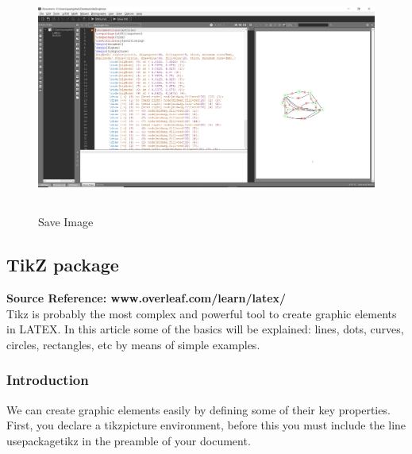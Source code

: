\documentclass[a4paper,10pt]{article}
\begin{document}
\paragraph{}
\begin{figure}[H]
		\centering
		\includegraphics[height = 3in]{tikzFunc2.png}
		\caption[Optional caption]{Save Image}
		\label{fig:Repository}
	\end{figure}
\paragraph{}
\subsection{TikZ package} 
\textbf{Source Reference: www.overleaf.com/learn/latex/} \\
Tikz is probably the most complex and powerful tool to create graphic elements in LATEX. In this article some of the basics will be explained: lines, dots, curves, circles, rectangles, etc by means of simple examples.

\subsubsection{Introduction}
We can create graphic elements easily by defining some of their key properties.
First, you declare a tikzpicture environment, before this you must include the line  usepackage{tikz} in the preamble of your document.
\end{document}
